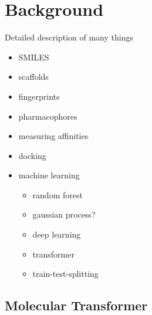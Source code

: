 \chapter{Background} \label{ch:background}

Detailed description of many things

\begin{itemize}
    \item SMILES
    \item scaffolds
    \item fingerprints
    \item pharmacophores
    \item measuring affinities
    \item docking
    \item machine learning
    \begin{itemize}
        \item random forest
        \item gaussian process?
        \item deep learning
        \item transformer
        \item train-test-splitting
    \end{itemize}
    
\end{itemize}

\section{Molecular Transformer}


